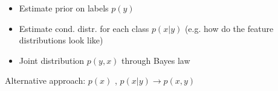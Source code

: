 \begin{itemize}
    \item Estimate prior on labels $p(y)$
    \item Estimate cond. distr. for each class $p(x|y)$ (e.g. how do the feature distributions look like)
    \item Joint distribution $p(y,x)$ through Bayes law 
\end{itemize}
Alternative approach: $p(x)$ , $p(x|y) \rightarrow p(x,y)$




